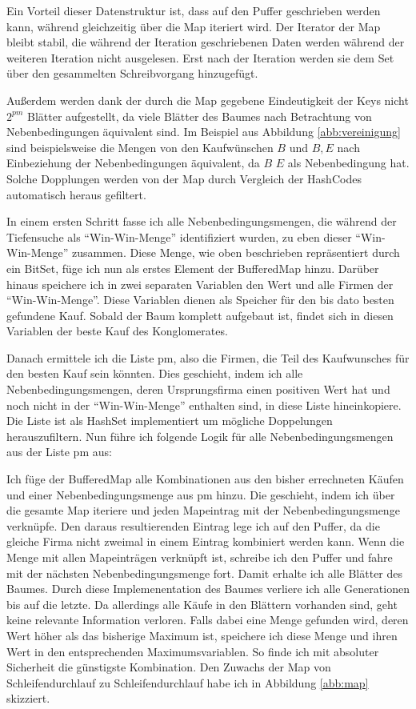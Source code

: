 Ein Vorteil dieser Datenstruktur ist, dass auf den Puffer geschrieben werden kann, während gleichzeitig über die Map iteriert wird. Der Iterator der Map bleibt stabil, die während der Iteration geschriebenen Daten werden während der weiteren Iteration nicht ausgelesen. Erst nach der Iteration werden sie dem Set über den gesammelten Schreibvorgang hinzugefügt.

Außerdem werden dank der durch die Map gegebene Eindeutigkeit der Keys nicht \(2^{pm}\) Blätter aufgestellt, da viele Blätter des Baumes nach Betrachtung von Nebenbedingungen äquivalent sind. Im Beispiel aus Abbildung \ref{abb:vereinigung} sind beispielsweise die Mengen von den Kaufwünschen \(B\) und \(B, E\) nach Einbeziehung der Nebenbedingungen äquivalent, da \(B\) \(E\) als Nebenbedingung hat. Solche Dopplungen werden von der Map durch Vergleich der HashCodes automatisch heraus gefiltert.

In einem ersten Schritt fasse ich alle Nebenbedingungsmengen, die während der Tiefensuche als "`Win-Win-Menge"' identifiziert wurden, zu eben dieser "`Win-Win-Menge"' zusammen. Diese Menge, wie oben beschrieben repräsentiert durch ein BitSet, füge ich nun als erstes Element der BufferedMap hinzu.
Darüber hinaus speichere ich in zwei separaten Variablen den Wert und alle Firmen der "`Win-Win-Menge"'. Diese Variablen dienen als Speicher für den bis dato besten gefundene Kauf. Sobald der Baum komplett aufgebaut ist, findet sich in diesen Variablen der beste Kauf des Konglomerates.

Danach ermittele ich die Liste pm, also die Firmen, die Teil des Kaufwunsches für den besten Kauf sein könnten. Dies geschieht, indem ich alle Nebenbedingungsmengen, deren Ursprungsfirma einen positiven Wert hat und noch nicht in der "`Win-Win-Menge"' enthalten sind, in diese Liste hineinkopiere. Die Liste ist als HashSet implementiert um mögliche Doppelungen herauszufiltern. Nun führe ich folgende Logik für alle Nebenbedingungsmengen aus der Liste pm aus:

Ich füge der BufferedMap alle Kombinationen aus den bisher errechneten Käufen und einer Nebenbedingungsmenge aus pm hinzu. Die geschieht, indem ich über die gesamte Map iteriere und jeden Mapeintrag mit der Nebenbedingungsmenge verknüpfe. Den daraus resultierenden Eintrag lege ich auf den Puffer, da die gleiche Firma nicht zweimal in einem Eintrag kombiniert werden kann. Wenn die Menge mit allen Mapeinträgen verknüpft ist, schreibe ich den Puffer und fahre mit der nächsten Nebenbedingungsmenge fort. Damit erhalte ich alle Blätter des Baumes. Durch diese Implemenentation des Baumes verliere ich alle Generationen bis auf die letzte. Da allerdings alle Käufe in den Blättern vorhanden sind, geht keine relevante Information verloren. Falls dabei eine Menge gefunden wird, deren Wert höher als das bisherige Maximum ist, speichere ich diese Menge und ihren Wert in den entsprechenden Maximumsvariablen. So finde ich mit absoluter Sicherheit die günstigste Kombination. Den Zuwachs der Map von Schleifendurchlauf zu Schleifendurchlauf habe ich in Abbildung \ref{abb:map} skizziert.

